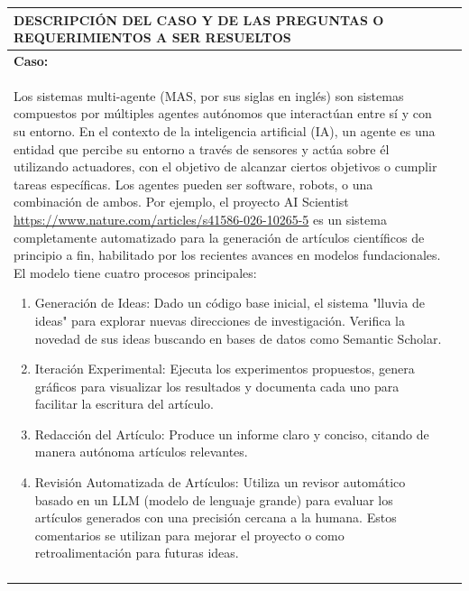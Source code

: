 \documentclass[12pt]{article}
\begin{document}
\newpage
\noindent
\begin{tabular}{|p{\textwidth}|@{}c@{}}
  \hline
  \centering\cellcolor{cyan}\textbf{\color{white}DESCRIPCIÓN DEL CASO Y DE LAS PREGUNTAS O REQUERIMIENTOS A SER RESUELTOS}&\\\hline
  \textbf{Caso:}&\\
  Los sistemas multi-agente (MAS, por sus siglas en inglés) son sistemas compuestos por múltiples agentes autónomos que interactúan entre sí y con su entorno. En el contexto de la inteligencia artificial (IA), un agente es una entidad que percibe su entorno a través de sensores y actúa sobre él utilizando actuadores, con el objetivo de alcanzar ciertos objetivos o cumplir tareas específicas. Los agentes pueden ser software, robots, o una combinación de ambos. Por ejemplo, el proyecto AI Scientist \url{https://www.nature.com/articles/s41586-026-10265-5} es un sistema completamente automatizado para la generación de artículos científicos de principio a fin, habilitado por los recientes avances en modelos fundacionales. El modelo tiene cuatro procesos principales:
  
  \begin{enumerate}
  \item Generación de Ideas: Dado un código base inicial, el sistema "lluvia de ideas" para explorar nuevas direcciones de investigación. Verifica la novedad de sus ideas buscando en bases de datos como Semantic Scholar.
  
  \item Iteración Experimental: Ejecuta los experimentos propuestos, genera gráficos para visualizar los resultados y documenta cada uno para facilitar la escritura del artículo.
  
  \item Redacción del Artículo: Produce un informe claro y conciso, citando de manera autónoma artículos relevantes.
  
  \item Revisión Automatizada de Artículos: Utiliza un revisor automático basado en un LLM (modelo de lenguaje grande) para evaluar los artículos generados con una precisión cercana a la humana. Estos comentarios se utilizan para mejorar el proyecto o como retroalimentación para futuras ideas.
  \end{enumerate}
 	 
  

 
 

 &\\&\\\hline
\end{tabular}
\end{document}

